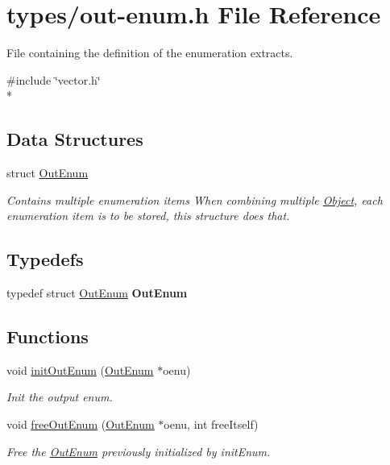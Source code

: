 \hypertarget{out-enum_8h}{}\section{types/out-\/enum.h File Reference}
\label{out-enum_8h}


File containing the definition of the enumeration extracts.  


{\ttfamily \#include \char`\"{}vector.\+h\char`\"{}}\\*
\subsection*{Data Structures}
\begin{DoxyCompactItemize}
\item 
struct \hyperlink{struct_out_enum}{Out\+Enum}
\begin{DoxyCompactList}\small\item\em Contains multiple enumeration items When combining multiple \hyperlink{struct_object}{Object}, each enumeration item is to be stored, this structure does that. \end{DoxyCompactList}\end{DoxyCompactItemize}
\subsection*{Typedefs}
\begin{DoxyCompactItemize}
\item 
typedef struct \hyperlink{struct_out_enum}{Out\+Enum} {\bfseries Out\+Enum}\hypertarget{out-enum_8h_a1248050dd67a829740c90433bcb35977}{}\label{out-enum_8h_a1248050dd67a829740c90433bcb35977}

\end{DoxyCompactItemize}
\subsection*{Functions}
\begin{DoxyCompactItemize}
\item 
void \hyperlink{out-enum_8h_af415f1148748b664423a90f8a9a340a4}{init\+Out\+Enum} (\hyperlink{struct_out_enum}{Out\+Enum} $\ast$oenu)
\begin{DoxyCompactList}\small\item\em Init the output enum. \end{DoxyCompactList}\item 
void \hyperlink{out-enum_8h_a5236ea757d0e93f3a0925de1a77c8362}{free\+Out\+Enum} (\hyperlink{struct_out_enum}{Out\+Enum} $\ast$oenu, int free\+Itself)
\begin{DoxyCompactList}\small\item\em Free the \hyperlink{struct_out_enum}{Out\+Enum} previously initialized by init\+Enum. \end{DoxyCompactList}\end{DoxyCompactItemize}


